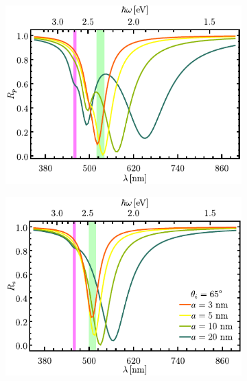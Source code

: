 \begin{figure}[h!]\centering\hspace*{-1.5em}
	\begin{subfigure}{.01\linewidth}\caption{}\label{sfig:R-RVar-cutp}\vspace{4.5cm}\end{subfigure}
	\begin{subfigure}{.45\linewidth}\hspace*{-1.5em}
	\includegraphics[scale=1]{2-Resultados/figs/3-Wp4rVar/cut_angle_65_p.pdf}\end{subfigure}
	\begin{subfigure}{.01\linewidth}\caption{}\label{sfig:R-RVar-cuts}\vspace{4.5cm}\end{subfigure}\hspace*{-1.em}
	\begin{subfigure}{.45\linewidth}\centering
	\includegraphics[scale=1 ]{2-Resultados/figs/3-Wp4rVar/cut_angle_65_s.pdf}\end{subfigure}\vspace*{-.5em}

\end{figure}
